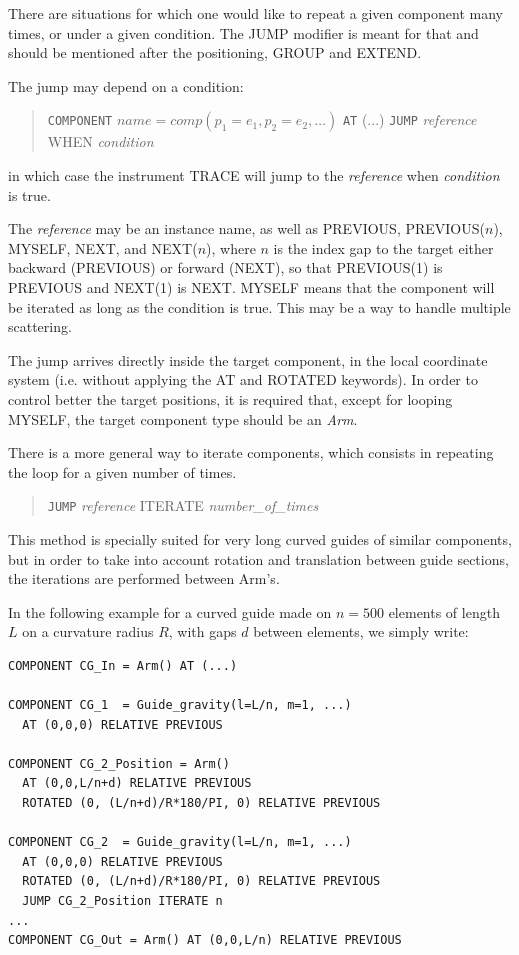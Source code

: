There are situations for which one would like to repeat a given component many times, or under a given condition. The JUMP modifier is meant for that and should be mentioned after the positioning, GROUP and EXTEND.

The jump may depend on a condition:
\begin{quote}
  \texttt{COMPONENT} $\textit{name} = \textit{comp}(p_1 = e_1, p_2 = e_2, \ldots)$
  \texttt{AT} (...)
  \texttt{JUMP} {\it reference} WHEN {\it condition}
\end{quote}
in which case the instrument TRACE will jump to the {\it reference} when {\it condition} is true.

The {\it reference} may be an instance name, as well as PREVIOUS, PREVIOUS($n$), MYSELF, NEXT, and NEXT($n$), where $n$ is the index gap to the target either backward (PREVIOUS) or forward (NEXT), so that PREVIOUS(1) is PREVIOUS and NEXT(1) is NEXT. MYSELF means that the component will be iterated as long as the condition is true. This may be a way to handle multiple scattering.

The jump arrives directly inside the target component, in the local coordinate system (i.e. without applying the AT and ROTATED keywords). In order to control better the target positions, it is required that, except for looping MYSELF, the target component type should be an \emph{Arm}.

There is a more general way to iterate components, which consists in repeating the loop for a given number of times.
\begin{quote}
  \texttt{JUMP} {\it reference} ITERATE {\it number\_of\_times}
\end{quote}
This method is specially suited for very long curved guides of similar components, but in order to take into account rotation and translation between guide sections, the iterations are performed between Arm's.

In the following example for a curved guide made on $n=500$ elements of length $L$ on a curvature radius $R$, with gaps $d$ between elements, we simply write:
\begin{verbatim}
COMPONENT CG_In = Arm() AT (...)

COMPONENT CG_1  = Guide_gravity(l=L/n, m=1, ...)
  AT (0,0,0) RELATIVE PREVIOUS

COMPONENT CG_2_Position = Arm()
  AT (0,0,L/n+d) RELATIVE PREVIOUS
  ROTATED (0, (L/n+d)/R*180/PI, 0) RELATIVE PREVIOUS

COMPONENT CG_2  = Guide_gravity(l=L/n, m=1, ...)
  AT (0,0,0) RELATIVE PREVIOUS
  ROTATED (0, (L/n+d)/R*180/PI, 0) RELATIVE PREVIOUS
  JUMP CG_2_Position ITERATE n
...
COMPONENT CG_Out = Arm() AT (0,0,L/n) RELATIVE PREVIOUS
\end{verbatim}

